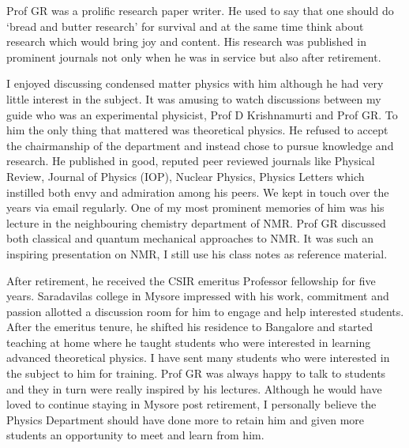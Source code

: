 Prof GR was a prolific research paper writer. He used to say that one should do `bread and butter research' for survival and at the same time think about research which would bring joy and content. His research was published in prominent journals not only when he was in service but also after retirement.

I enjoyed discussing condensed matter physics with him although he had very little interest in the subject. It was
amusing to watch discussions between my guide who was an experimental physicist, Prof D Krishnamurti and
Prof GR. To him the only thing that mattered was theoretical physics. He refused to accept the chairmanship
of the department and instead chose to pursue knowledge and research. He published in good, reputed peer
reviewed journals like Physical Review, Journal of Physics (IOP), Nuclear Physics, Physics Letters which instilled
both envy and admiration among his peers. We kept in touch over the years via email regularly. One of my most prominent memories of him was his lecture in the neighbouring chemistry department of NMR. Prof GR discussed 
both classical and quantum mechanical approaches to NMR. It was such an inspiring presentation on NMR, I still
use his class notes as reference material.

After retirement, he received the CSIR emeritus Professor fellowship for five years. Saradavilas college in
Mysore impressed with his work, commitment and passion allotted a discussion room for him to engage and
help interested students. After the emeritus tenure, he shifted his residence to Bangalore and started teaching at
home where he taught students who were interested in learning advanced theoretical physics. I have sent many
students who were interested in the subject to him for training. Prof GR was always happy to talk to students and
they in turn were really inspired by his lectures. Although he would have loved to continue staying in Mysore post
retirement, I personally believe the Physics Department should have done more to retain him and given more
students an opportunity to meet and learn from him.

